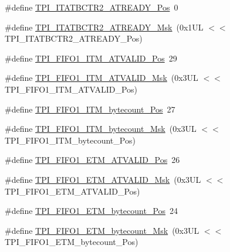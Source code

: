 \begin{DoxyCompactItemize}
\item 
\#define \mbox{\hyperlink{group___c_m_s_i_s___t_p_i_ga6959f73d7db4a87ae9ad9cfc99844526}{T\+P\+I\+\_\+\+I\+T\+A\+T\+B\+C\+T\+R2\+\_\+\+A\+T\+R\+E\+A\+D\+Y\+\_\+\+Pos}}~0
\item 
\#define \mbox{\hyperlink{group___c_m_s_i_s___t_p_i_ga1859502749709a2e5ead9a2599d998db}{T\+P\+I\+\_\+\+I\+T\+A\+T\+B\+C\+T\+R2\+\_\+\+A\+T\+R\+E\+A\+D\+Y\+\_\+\+Msk}}~(0x1\+U\+L $<$$<$ T\+P\+I\+\_\+\+I\+T\+A\+T\+B\+C\+T\+R2\+\_\+\+A\+T\+R\+E\+A\+D\+Y\+\_\+\+Pos)
\item 
\#define \mbox{\hyperlink{group___c_m_s_i_s___t_p_i_ga08edfc862b2c8c415854cc4ae2067dfb}{T\+P\+I\+\_\+\+F\+I\+F\+O1\+\_\+\+I\+T\+M\+\_\+\+A\+T\+V\+A\+L\+I\+D\+\_\+\+Pos}}~29
\item 
\#define \mbox{\hyperlink{group___c_m_s_i_s___t_p_i_gabc1f6a3b6cac0099d7c01ca949b4dd08}{T\+P\+I\+\_\+\+F\+I\+F\+O1\+\_\+\+I\+T\+M\+\_\+\+A\+T\+V\+A\+L\+I\+D\+\_\+\+Msk}}~(0x3\+U\+L $<$$<$ T\+P\+I\+\_\+\+F\+I\+F\+O1\+\_\+\+I\+T\+M\+\_\+\+A\+T\+V\+A\+L\+I\+D\+\_\+\+Pos)
\item 
\#define \mbox{\hyperlink{group___c_m_s_i_s___t_p_i_gaa22ebf7c86e4f4b2c98cfd0b5981375a}{T\+P\+I\+\_\+\+F\+I\+F\+O1\+\_\+\+I\+T\+M\+\_\+bytecount\+\_\+\+Pos}}~27
\item 
\#define \mbox{\hyperlink{group___c_m_s_i_s___t_p_i_gacba2edfc0499828019550141356b0dcb}{T\+P\+I\+\_\+\+F\+I\+F\+O1\+\_\+\+I\+T\+M\+\_\+bytecount\+\_\+\+Msk}}~(0x3\+U\+L $<$$<$ T\+P\+I\+\_\+\+F\+I\+F\+O1\+\_\+\+I\+T\+M\+\_\+bytecount\+\_\+\+Pos)
\item 
\#define \mbox{\hyperlink{group___c_m_s_i_s___t_p_i_ga3177b8d815cf4a707a2d3d3d5499315d}{T\+P\+I\+\_\+\+F\+I\+F\+O1\+\_\+\+E\+T\+M\+\_\+\+A\+T\+V\+A\+L\+I\+D\+\_\+\+Pos}}~26
\item 
\#define \mbox{\hyperlink{group___c_m_s_i_s___t_p_i_ga0e8f29a1e9378d1ceb0708035edbb86d}{T\+P\+I\+\_\+\+F\+I\+F\+O1\+\_\+\+E\+T\+M\+\_\+\+A\+T\+V\+A\+L\+I\+D\+\_\+\+Msk}}~(0x3\+U\+L $<$$<$ T\+P\+I\+\_\+\+F\+I\+F\+O1\+\_\+\+E\+T\+M\+\_\+\+A\+T\+V\+A\+L\+I\+D\+\_\+\+Pos)
\item 
\#define \mbox{\hyperlink{group___c_m_s_i_s___t_p_i_gaab31238152b5691af633a7475eaf1f06}{T\+P\+I\+\_\+\+F\+I\+F\+O1\+\_\+\+E\+T\+M\+\_\+bytecount\+\_\+\+Pos}}~24
\item 
\#define \mbox{\hyperlink{group___c_m_s_i_s___t_p_i_gab554305459953b80554fdb1908b73291}{T\+P\+I\+\_\+\+F\+I\+F\+O1\+\_\+\+E\+T\+M\+\_\+bytecount\+\_\+\+Msk}}~(0x3\+U\+L $<$$<$ T\+P\+I\+\_\+\+F\+I\+F\+O1\+\_\+\+E\+T\+M\+\_\+bytecount\+\_\+\+Pos)
\item 
$$
\end{DoxyCompactItemize}
